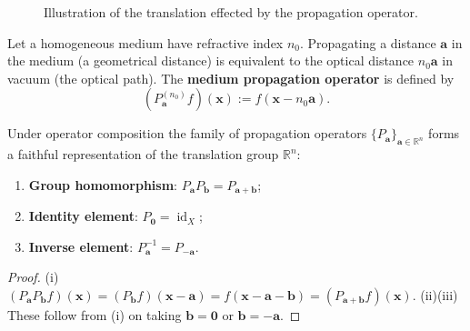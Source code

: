 \begin{figure}[htbp]
\centering
{}
\caption{Illustration of the translation effected by the propagation operator.}
\label{fig:propagation_operator}
\end{figure}

\begin{definition}\label{def:medium_propagation_operator}
Let a homogeneous medium have refractive index $n_0$. Propagating a distance $\mathbf{a}$ in the medium (a geometrical distance) is equivalent to the optical distance $n_0\mathbf{a}$ in vacuum (the optical path). The \textbf{medium propagation operator} is defined by
\[
(P_{\mathbf{a}}^{(n_0)} f)(\mathbf{x}) := f(\mathbf{x}-n_0\mathbf{a}).
\]
\end{definition}

\begin{proposition}\label{prop:propagation_group}
Under operator composition the family of propagation operators $\{P_{\mathbf{a}}\}_{\mathbf{a}\in\mathbb{R}^n}$ forms a faithful representation of the translation group $\mathbb{R}^n$:
\begin{enumerate}[label=(\roman*)]
    \item \textbf{Group homomorphism}: $P_{\mathbf{a}}P_{\mathbf{b}} = P_{\mathbf{a}+\mathbf{b}}$;
    \item \textbf{Identity element}: $P_{\mathbf{0}} = \operatorname{id}_X$;
    \item \textbf{Inverse element}: $P_{\mathbf{a}}^{-1} = P_{-\mathbf{a}}$.
\end{enumerate}
\end{proposition}

\begin{proof}
(i) $(P_{\mathbf{a}}P_{\mathbf{b}}f)(\mathbf{x}) = (P_{\mathbf{b}}f)(\mathbf{x}-\mathbf{a}) = f(\mathbf{x}-\mathbf{a}-\mathbf{b}) = (P_{\mathbf{a}+\mathbf{b}}f)(\mathbf{x})$. (ii)(iii) These follow from (i) on taking $\mathbf{b}=\mathbf{0}$ or $\mathbf{b}=-\mathbf{a}$.
\end{proof}

